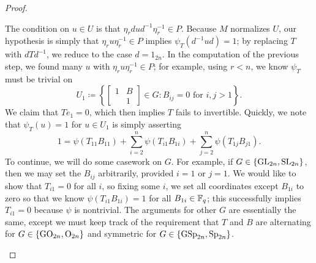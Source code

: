 \begin{proof}
\begin{enumerate}
		The condition on $u\in U$ is that $\eta_rdud^{-1}\eta_r^{-1}\in P$. Because $M$ normalizes $U$, our hypothesis is simply that $\eta_ru\eta_r^{-1}\in P$ implies $\psi_T\left(d^{-1}ud\right)=1$; by replacing $T$ with $dTd^{-1}$, we reduce to the case $d=1_{2n}$. In the computation of the previous step, we found many $u$ with $\eta_ru\eta_r^{-1}\in P$; for example, using $r<n$, we know $\psi_T$ must be trivial on
		\[U_1\coloneqq\left\{\begin{bmatrix}
			1 & B \\ & 1
		\end{bmatrix}\in G:B_{ij}=0\text{ for }i,j>1\right\}.\]
		We claim that $Te_1=0$, which
        then implies $T$ fails to invertible. Quickly, we note that $\psi_T(u)=1$ for $u\in U_1$ is simply asserting
        \[1=\psi(T_{11}B_{11})+\sum_{i=2}^n\psi(T_{i1}B_{1i})+\sum_{j=2}^n\psi(T_{1j}B_{j1}).\]
		To continue, we will do some casework on $G$. For example, if $G\in\{\mathrm{GL}_{2n},\mathrm{SL}_{2n}\}$, then we may set the $B_{ij}$ arbitrarily, provided $i=1$ or $j=1$. We would like to show that $T_{i1}=0$ for all $i$, so fixing some $i$, we set all coordinates except $B_{1i}$ to zero so that we know $\psi(T_{i1}B_{1i})=1$ for all $B_{1i}\in\mathbb F_q$; this successfully implies $T_{i1}=0$ because $\psi$ is nontrivial. The arguments for other $G$ are essentially the same, except we must keep track of the requirement that $T$ and $B$ are alternating for $G\in\{\mathrm{GO}_{2n},\mathrm{O}_{2n}\}$ and symmetric for $G\in\{\mathrm{GSp}_{2n},\mathrm{Sp}_{2n}\}$.

\end{enumerate}
\end{proof}
